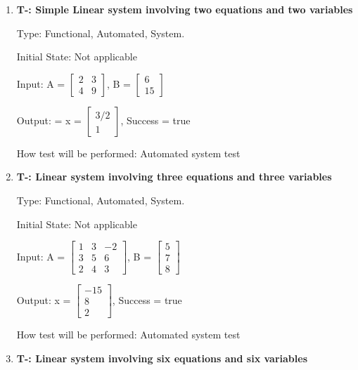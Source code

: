 \documentclass[12pt, titlepage]{article}
\newcounter{tnum}
\begin{document}
\begin{enumerate}

\item{\textbf{T-\thetnum \label{t-gauss-jordan_simple}: Simple Linear system involving two equations and two variables}}


Type: Functional, Automated, System.
					
Initial State: Not applicable
					
Input: A = $\begin{bmatrix} 
2 & 3 \\
4 & 9 
\end{bmatrix}$, B = $\begin{bmatrix} 
6 \\
15 
\end{bmatrix}$

Output: = x = $\begin{bmatrix} 
3/2\\
1
\end{bmatrix}$, Success = true
					
How test will be performed: Automated system test
					
\item{\textbf{T-\thetnum \label{t-gauss-jordan elimination_three}: Linear system involving three equations and three variables}}

Type: Functional, Automated, System.
					
Initial State: Not applicable
					
Input: A =  $\begin{bmatrix} 
1 & 3 & -2 \\
3 & 5 & 6\\
2 & 4 & 3
\end{bmatrix}$, B = $\begin{bmatrix} 
5\\
7\\
8 
\end{bmatrix}$
					
Output: x = $\begin{bmatrix} 
-15\\
8\\
2 
\end{bmatrix}$, Success = true
					
How test will be performed: Automated system test

\item{\textbf{T-\thetnum \label{t-gauss-jordan_six}: Linear system involving six equations and six variables}}


\end{enumerate}
\end{document}
